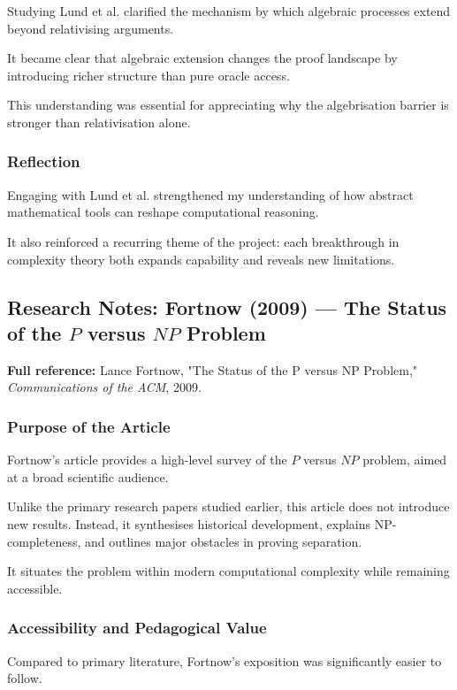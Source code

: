 \documentclass[12pt]{article}
\begin{document}
Studying Lund et al. clarified the mechanism by which algebraic processes extend beyond relativising arguments.

It became clear that algebraic extension changes the proof landscape by introducing richer structure than pure oracle access.

This understanding was essential for appreciating why the algebrisation barrier is stronger than relativisation alone.

\subsubsection*{Reflection}

Engaging with Lund et al. strengthened my understanding of how abstract mathematical tools can reshape computational reasoning.

It also reinforced a recurring theme of the project: each breakthrough in complexity theory both expands capability and reveals new limitations.

\subsection{Research Notes: Fortnow (2009) --- The Status of the $P$ versus $NP$ Problem}

\textbf{Full reference:} Lance Fortnow,
"The Status of the P versus NP Problem,"
\textit{Communications of the ACM}, 2009.

\subsubsection*{Purpose of the Article}

Fortnow's article provides a high-level survey of the $P$ versus $NP$ problem, aimed at a broad scientific audience.

Unlike the primary research papers studied earlier, this article does not introduce new results. Instead, it synthesises historical development, explains NP-completeness, and outlines major obstacles in proving separation.

It situates the problem within modern computational complexity while remaining accessible.

\subsubsection*{Accessibility and Pedagogical Value}

Compared to primary literature, Fortnow's exposition was significantly easier to follow.
\end{document}
